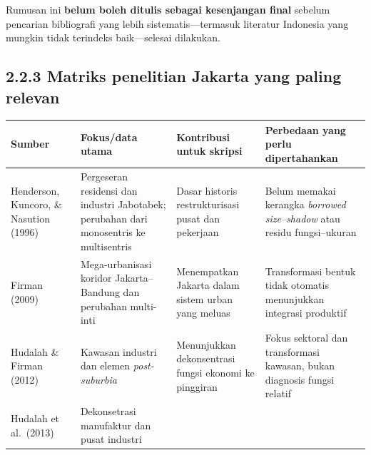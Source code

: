 \documentclass[
  indonesian,
  11pt,
  a4paper,
  oneside,
  openany]{report}
\newcounter{none} %
\begin{document}
Rumusan ini \textbf{belum boleh ditulis sebagai kesenjangan final}
sebelum pencarian bibliografi yang lebih sistematis---termasuk literatur
Indonesia yang mungkin tidak terindeks baik---selesai dilakukan.

\subsection{2.2.3 Matriks penelitian Jakarta yang paling
relevan}\label{matriks-penelitian-jakarta-yang-paling-relevan}

{\def\LTcaptype{none} %
\begin{longtable}[]{@{}
  >{\raggedright\arraybackslash}p{}
  >{\raggedright\arraybackslash}p{}
  >{\raggedright\arraybackslash}p{}
  >{\raggedright\arraybackslash}p{}@{}}
\toprule\noalign{}
\begin{minipage}[b]{\linewidth}\raggedright
Sumber
\end{minipage} & \begin{minipage}[b]{\linewidth}\raggedright
Fokus/data utama
\end{minipage} & \begin{minipage}[b]{\linewidth}\raggedright
Kontribusi untuk skripsi
\end{minipage} & \begin{minipage}[b]{\linewidth}\raggedright
Perbedaan yang perlu dipertahankan
\end{minipage} \\
\midrule\noalign{}
\endhead
\bottomrule\noalign{}
\endlastfoot
Henderson, Kuncoro, \& Nasution (1996) & Pergeseran residensi dan
industri Jabotabek; perubahan dari monosentris ke multisentris & Dasar
historis restrukturisasi pusat dan pekerjaan & Belum memakai kerangka
\emph{borrowed size--shadow} atau residu fungsi--ukuran \\
Firman (2009) & Mega-urbanisasi koridor Jakarta--Bandung dan perubahan
multi-inti & Menempatkan Jakarta dalam sistem urban yang meluas &
Transformasi bentuk tidak otomatis menunjukkan integrasi produktif \\
Hudalah \& Firman (2012) & Kawasan industri dan elemen
\emph{post-suburbia} & Menunjukkan dekonsentrasi fungsi ekonomi ke
pinggiran & Fokus sektoral dan transformasi kawasan, bukan diagnosis
fungsi relatif \\
Hudalah et al.~(2013) & Dekonsetrasi manufaktur dan pusat industri

\end{longtable}}
\end{document}

